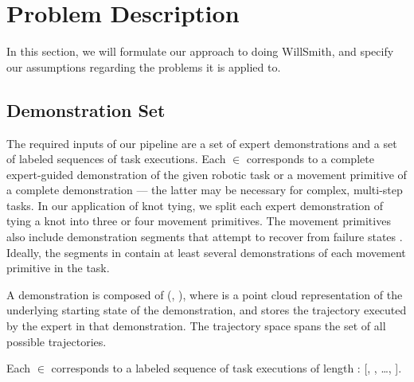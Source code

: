 \section{Problem Description}
\label{sec:formulation}
%

In this section, we will formulate our approach to doing WillSmith, and
specify our assumptions regarding the problems it is applied to.

\subsection{Demonstration Set}

The required inputs of our pipeline are a set \demoset{}
of expert demonstrations and a set  of labeled sequences of
task executions.
Each \demovar{} $\in$ \demoset{} corresponds to a complete expert-guided
demonstration of the given robotic task or a movement primitive of a complete
demonstration --- the latter may be necessary for complex, multi-step tasks.
In our application of knot tying, we split each expert demonstration of
tying a knot into three or four movement primitives. The movement primitives
also include demonstration segments that attempt to
recover from failure states \cite{Schulmanet al_ISRR2013}.
Ideally, the segments in \demoset{} contain at least several demonstrations
of each movement primitive in the task.

A demonstration \demovar{} is composed of (, ),
where  is a point cloud representation of the underlying
starting state of the demonstration, and  stores
the trajectory executed by the expert in that demonstration. The trajectory
space \trajset{} spans the set of all possible trajectories.

Each  $\in$  corresponds to a labeled sequence of
task executions of length : [, , \ldots,
]. 

